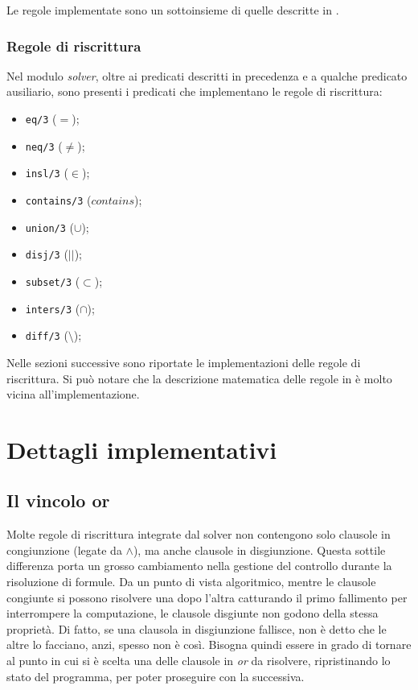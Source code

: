 \documentclass[12pt,a4paper,openright]{book} %
\begin{document}
Le regole implementate sono un sottoinsieme di quelle descritte in \cite{Rossi18}.

\subsection{Regole di riscrittura}

Nel modulo \emph{solver}, oltre ai predicati descritti in precedenza e a qualche predicato ausiliario, sono presenti i predicati che implementano le regole di riscrittura:
\begin{itemize}
\item \verb|eq/3| ($=$);
\item \verb|neq/3| ($\neq$);
\item \verb|insl/3| ($\in$);
\item \verb|contains/3| ($contains$);
\item \verb|union/3| ($\cup$);
\item \verb|disj/3| ($||$);
\item \verb|subset/3| ($\subset$);
\item \verb|inters/3| ($\cap$);
\item \verb|diff/3| ($\setminus$);
\end{itemize}

Nelle sezioni successive sono riportate le implementazioni delle regole di riscrittura. Si può notare che la descrizione matematica delle regole in \cite{Rossi18} è molto vicina all'implementazione.


\chapter{Dettagli implementativi}

\section{Il vincolo or}

Molte regole di riscrittura integrate dal solver non contengono solo clausole in congiunzione (legate da $\land$), ma anche clausole in disgiunzione. Questa sottile differenza porta un grosso cambiamento nella gestione del controllo durante la risoluzione di formule. Da un punto di vista algoritmico, mentre le clausole congiunte si possono risolvere una dopo l'altra catturando il primo fallimento per interrompere la computazione, le clausole disgiunte non godono della stessa proprietà. Di fatto, se una clausola in disgiunzione fallisce, non è detto che le altre lo facciano, anzi, spesso non è così. Bisogna quindi essere in grado di tornare al punto in cui si è scelta una delle clausole in \emph{or} da risolvere, ripristinando lo stato del programma, per poter proseguire con la successiva.
\end{document}
